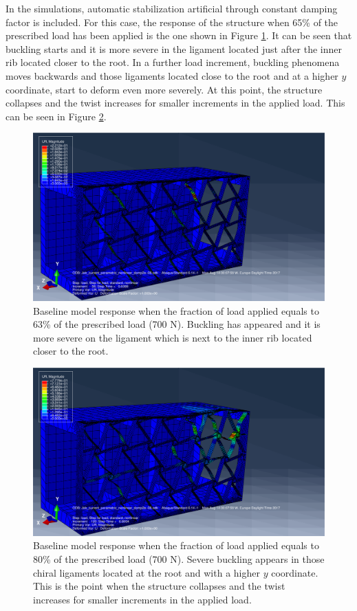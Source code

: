   In the simulations, automatic stabilization artificial through constant damping factor is included. For this case, the response of the structure when 65\% of the prescribed load has been applied is the one shown in Figure \ref{fig:1-UR}. It can be seen that buckling starts and it is more severe in the ligament located just after the inner rib located closer to the root. In a further load increment, buckling phenomena moves backwards and those ligaments located close to the root and at a higher $y$ coordinate, start to deform even more severely. At this point, the structure collapses and the twist increases for smaller increments in the applied load. This can be seen in Figure \ref{fig:2-UR}.

  \begin{figure}[!htpb] %
    \centering
    \includegraphics[width=0.8 \textwidth]{../figures/result-sim/1-UR}
    \caption[Baseline model response when the fraction of load applied equals to 63\% of the prescribed load (700 N)]{Baseline model response when the fraction of load applied equals to 63\% of the prescribed load (700 N). Buckling has appeared and it is more severe on the ligament which is next to the inner rib located closer to the root.}\label{fig:1-UR}
  \end{figure}

  \begin{figure}[!htpb] %
    \centering
    \includegraphics[width=0.8 \textwidth]{../figures/result-sim/2-UR}
    \caption[Baseline model response when the fraction of load applied equals to 80\% of the prescribed load (700 N)]{Baseline model response when the fraction of load applied equals to 80\% of the prescribed load (700 N). Severe buckling appears in those chiral ligaments located at the root and with a higher $y$ coordinate. This is the point when the structure collapses and the twist increases for smaller increments in the applied load.}\label{fig:2-UR}
  \end{figure}

